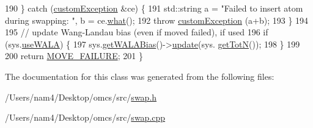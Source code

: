 \begin{DoxyCode}
190     \} \textcolor{keywordflow}{catch} (\hyperlink{classcustom_exception}{customException} &ce) \{
191         std::string a = \textcolor{stringliteral}{"Failed to insert atom during swapping: "}, b = ce.\hyperlink{classcustom_exception_aeb6ab5848b038adfc68fde86a512f691}{what}();
192         \textcolor{keywordflow}{throw} \hyperlink{classcustom_exception}{customException} (a+b);
193     \}
194         
195                 \textcolor{comment}{// update Wang-Landau bias (even if moved failed), if used}
196                 \textcolor{keywordflow}{if} (sys.\hyperlink{classsim_system_aa83b00006b3919fb6e13f1bdeadece6a}{useWALA}) \{
197                                 sys.\hyperlink{classsim_system_a7cb5049de8b0988349e89e30e4000407}{getWALABias}()->\hyperlink{classwala_a5eb2622be6a9e89f5e59ba0b15aca4bd}{update}(sys.
      \hyperlink{classsim_system_a37dd827f4057049763351510147b9f1d}{getTotN}());
198                 \}
199                 
200                 \textcolor{keywordflow}{return} \hyperlink{moves_8h_a9832cf5fcfa8c0894545b591c9908e39}{MOVE\_FAILURE};
201 \}
\end{DoxyCode}


The documentation for this class was generated from the following files\+:\begin{DoxyCompactItemize}
\item 
/\+Users/nam4/\+Desktop/omcs/src/\hyperlink{swap_8h}{swap.\+h}\item 
/\+Users/nam4/\+Desktop/omcs/src/\hyperlink{swap_8cpp}{swap.\+cpp}\end{DoxyCompactItemize}
